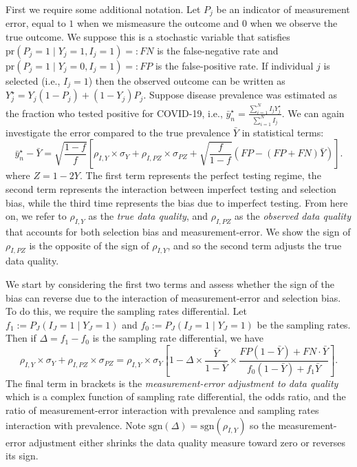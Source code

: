 \documentclass[11pt]{article}
\numberwithin{equation}{section}
\theoremstyle{plain}
\def\pr{\text{pr}}
\def\sgn{\text{sgn}}
\begin{document}
First we require some additional notation.  Let $P_j$ be an indicator of measurement error, equal to $1$ when we mismeasure the outcome and $0$ when we observe the true outcome. We suppose this is a stochastic variable that satisfies $\pr(P_j = 1 \mid Y_j = 1, I_j = 1) =: FN$ is the false-negative rate and $\pr(P_j = 1 \mid Y_j = 0, I_j = 1) =: FP$ is the false-positive rate.  If individual $j$ is selected (i.e., $I_j = 1$) then the observed outcome can be written as $Y_j^\star = Y_j(1-P_j) + (1-Y_j) P_j$.  Suppose disease prevalence was estimated as the fraction who tested positive for COVID-19, i.e., $\bar y_n^\star = \frac{\sum_{i=1}^N I_j Y_j^\star}{\sum_{i=1}^N I_j}$.  We can again investigate the error compared to the true prevalence $\bar Y$ in statistical terms:
$$
\bar y_n^\star - \bar Y = \sqrt{\frac{1-f}{f}} \left[ \rho_{I,Y} \times \sigma_Y + \rho_{I,PZ} \times \sigma_{PZ} + \sqrt{\frac{f}{1-f}}  \left( FP - (FP+FN) \bar Y \right) \right] .
$$
where $Z = 1-2Y$. The first term represents the perfect testing regime, the second term represents the interaction between imperfect testing and selection bias, while the third time represents the bias due to imperfect testing.  From here on, we refer to $\rho_{I,Y}$ as the \emph{true data quality}, and $\rho_{I,PZ}$ as the \emph{observed data quality} that accounts for both selection bias and measurement-error.  We show the sign of $\rho_{I,PZ}$ is the opposite of the sign of $\rho_{I,Y}$, and so the second term adjusts the true data quality.

We start by considering the first two terms and assess whether the sign of the bias can reverse due to the interaction of measurement-error and selection bias.  To do this, we require the sampling rates differential.  Let $f_1 := P_J(I_J = 1 \mid Y_J = 1)$ and $f_0 := P_J(I_J = 1 \mid Y_J = 1)$ be the sampling rates.  Then if $\Delta = f_1 - f_0$ is the sampling rate differential, we have
$$
\rho_{I,Y} \times \sigma_Y + \rho_{I,PZ} \times \sigma_{PZ} =
\rho_{I,Y} \times \sigma_Y \left[ 1 - \Delta \times \frac{\bar Y}{1-\bar Y} \times \frac{FP(1-\bar Y) + FN \cdot \bar Y}{f_0 (1-\bar Y) + f_1 \bar Y} \right].
$$
The final term in brackets is the \emph{measurement-error adjustment to data quality} which is a complex function of sampling rate differential, the odds ratio, and the ratio of measurement-error interaction with prevalence and sampling rates interaction with prevalence. Note $\sgn(\Delta) = \sgn(\rho_{I,Y})$ so the measurement-error adjustment either shrinks the data quality measure toward zero or reverses its sign.
\end{document}
